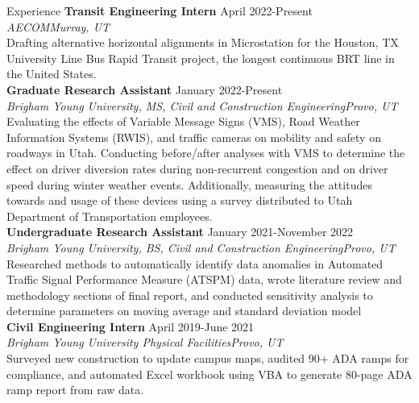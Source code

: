 \documentclass{resume} %
\begin{document}
\begin{rSection}{Experience}
{\bf Transit Engineering Intern} \hfill {April 2022-Present} \\
{\em AECOM}\hfill {\em Murray, UT} \\
Drafting alternative horizontal alignments in Microstation for the Houston, TX University Line Bus Rapid Transit project, the longest continuous BRT line in the United States. \\

{\bf Graduate Research Assistant} \hfill {January 2022-Present} \\
{\em Brigham Young University, MS, Civil and Construction Engineering}\hfill {\em Provo, UT} \\
Evaluating the effects of Variable Message Signs (VMS), Road Weather Information Systems (RWIS), and traffic cameras on mobility and safety on roadways in Utah. Conducting before/after analyses with VMS to determine the effect on driver diversion rates during non-recurrent congestion and on driver speed during winter weather events. Additionally, measuring the attitudes towards and usage of these devices using a survey distributed to Utah Department of Transportation employees. \\

{\bf Undergraduate Research Assistant} \hfill {January 2021-November 2022} \\
{\em Brigham Young University, BS, Civil and Construction Engineering}\hfill {\em Provo, UT} \\
Researched methods to automatically identify data anomalies in Automated Traffic Signal Performance Measure (ATSPM) data, wrote literature review and methodology sections of final report, and conducted sensitivity analysis to determine parameters on moving average and standard deviation model \\

{\bf Civil Engineering Intern} \hfill {April 2019-June 2021} \\
{\em Brigham Young University Physical Facilities}\hfill {\em Provo, UT} \\
Surveyed new construction to update campus maps, audited 90+ ADA ramps for compliance, and automated Excel workbook using VBA to generate 80-page ADA ramp report from raw data.

\end{rSection}


\end{document}
